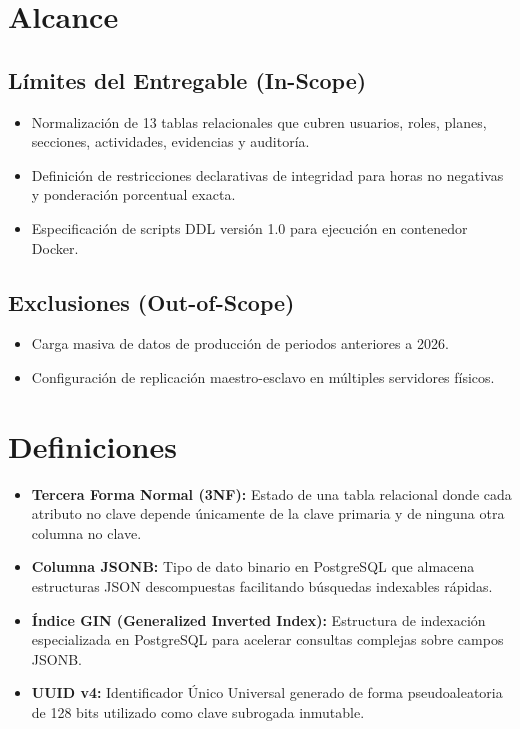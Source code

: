 \documentclass[12pt,a4paper]{article}
\begin{document}
\section{Alcance}
\subsection{Límites del Entregable (In-Scope)}
\begin{itemize}[leftmargin=1.5em, itemsep=2pt]
    \item Normalización de 13 tablas relacionales que cubren usuarios, roles, planes, secciones, actividades, evidencias y auditoría.
    \item Definición de restricciones declarativas de integridad para horas no negativas y ponderación porcentual exacta.
    \item Especificación de scripts DDL versión 1.0 para ejecución en contenedor Docker.
\end{itemize}
\subsection{Exclusiones (Out-of-Scope)}
\begin{itemize}[leftmargin=1.5em, itemsep=2pt]
    \item Carga masiva de datos de producción de periodos anteriores a 2026.
    \item Configuración de replicación maestro-esclavo en múltiples servidores físicos.
\end{itemize}

\section{Definiciones}
\begin{itemize}[leftmargin=1.5em, itemsep=2pt]
    \item \textbf{Tercera Forma Normal (3NF):} Estado de una tabla relacional donde cada atributo no clave depende únicamente de la clave primaria y de ninguna otra columna no clave.
    \item \textbf{Columna JSONB:} Tipo de dato binario en PostgreSQL que almacena estructuras JSON descompuestas facilitando búsquedas indexables rápidas.
    \item \textbf{Índice GIN (Generalized Inverted Index):} Estructura de indexación especializada en PostgreSQL para acelerar consultas complejas sobre campos JSONB.
    \item \textbf{UUID v4:} Identificador Único Universal generado de forma pseudoaleatoria de 128 bits utilizado como clave subrogada inmutable.
\end{itemize}
\end{document}
